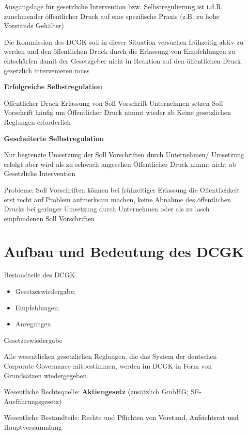 \documentclass[
]{article}
\providecommand{\tightlist}{%
  \setlength{\itemsep}{0pt}\setlength{\parskip}{0pt}}
\begin{document}
Ausgangslage für gesetzliche Intervention bzw. Selbstregulierung ist
i.d.R. zunehmender öffentlicher Druck auf eine spezifische Praxis (z.B.
zu hohe Vorstands Gehälter)

Die Kommission des DCGK soll in dieser Situation versuchen frühzeitig
aktiv zu werden und den öffentlichen Druck durch die Erlassung von
Empfehlungen zu entschärfen damit der Gesetzgeber nicht in Reaktion auf
den öffentlichen Druck gesetzlich intervenieren muss

\textbf{Erfolgreiche Selbstregulation}

Öffentlicher Druck Erlassung von Soll Vorschrift Unternehmen setzen Soll
Vorschrift häufig um Öffentlicher Druck nimmt wieder ab Keine
gesetzlichen Reglungen erforderlich

\textbf{Gescheiterte Selbstregulation}

Nur begrenzte Umsetzung der Soll Vorschriften durch Unternehmen/
Umsetzung erfolgt aber wird als zu schwach angesehen Öffentlicher Druck
nimmt nicht ab Gesetzliche Intervention

Probleme: Soll Vorschriften können bei frühzeitiger Erlassung die
Öffentlichkeit erst recht auf Problem aufmerksam machen, keine Abnahme
des öffentlichen Drucks bei geringer Umsetzung durch Unternehmen oder
als zu lasch empfundenen Soll Vorschriften

\hypertarget{aufbau-und-bedeutung-des-dcgk}{%
\section{Aufbau und Bedeutung des
DCGK}\label{aufbau-und-bedeutung-des-dcgk}}

Bestandteile des DCGK

\begin{itemize}
\tightlist
\item
  Gesetzeswiedergabe;
\item
  Empfehlungen;
\item
  Anregungen
\end{itemize}

Gesetzeswiedergabe

Alle wesentlichen gesetzlichen Reglungen, die das System der deutschen
Corporate Governance mitbestimmen, werden im DCGK in Form von
Grundsätzen wiedergegeben.

Wesentliche Rechtsquelle: \textbf{Aktiengesetz} (zusätzlich GmbHG;
SE-Ausführungsgesetz)

Wesentliche Bestandteile: Rechte und Pflichten von Vorstand,
Aufsichtsrat und Hauptversammlung
\end{document}
